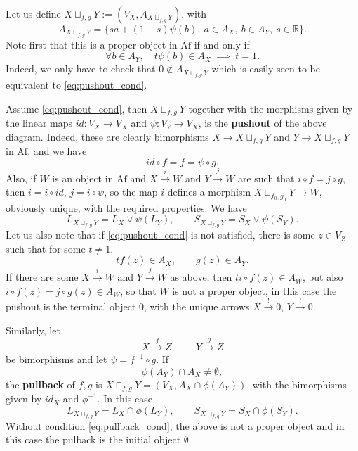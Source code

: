 \documentclass[12pt]{article}
\theoremstyle{definition}
\theoremstyle{remark}
\def \Af{\mathrm{Af}}
\begin{document}
Let us define  $X\sqcup_{f,g} Y:=(V_X,A_{X\sqcup_{f,g} Y})$, with 
\[
A_{X\sqcup_{f,g} Y}=\{sa+(1-s)\psi(b),\ a\in A_X,\ b\in A_Y,\ s\in \mathbb R\}.
\]
Note first that this is a proper object in $\Af$ if and only if 
\begin{equation}\label{eq:pushout_cond}
\forall b\in A_Y,\quad t\psi(b)\in A_X \ \implies \ t=1.
\end{equation}
Indeed, we only have to check that
$0\notin A_{X\sqcup_{f,g}Y}$ which is easily seen to be equivalent to
\eqref{eq:pushout_cond}. 

Assume \eqref{eq:pushout_cond}, then $X\sqcup_{f,g} Y$ together with the morphisms given by the linear maps
$id:V_X\to V_X$ and $\psi:V_Y\to V_X$,  is the \textbf{pushout} of the above diagram. Indeed, these are clearly bimorphisms $X\to X\sqcup_{f,g} Y$ and $Y\to X\sqcup_{f,g} Y$ in $\Af$, and we have 
\[
id\circ f=f=\psi\circ g.
\]
Also, if  $W$ is an object in $\Af$ and $X\xrightarrow{i} W$ and $Y\xrightarrow{j} W$ are such that $i\circ f=j\circ
g$, then $i=i\circ id$, $j=i\circ \psi$, so the map $i$ defines a morphism
$X\sqcup_{f_0,g_0} Y\to W$,
obviously unique, with the required properties. We have
\[
L_{X\sqcup_{f,g}Y}=L_X\vee \psi(L_Y),\qquad S_{X\sqcup_{f,g}Y}=S_X\vee
\psi(S_Y).
\]
Let us also note that if \eqref{eq:pushout_cond} is not satisfied,  there is some $z\in V_Z$ such
that for some $t\ne 1$,
\[
tf(z)\in A_X,\qquad g(z)\in A_Y.
\]
If there are some $X\xrightarrow{i} W$ and $Y\xrightarrow{j} W$ as above, then 
$ti\circ f(z)\in A_W$, but also $i\circ f(z)=j\circ g(z)\in A_W$, so that $W$ is not a
proper object, in this case the pushout is the terminal object $0$, with the unique arrows
$X\xrightarrow{!} 0$, $Y\xrightarrow{!} 0$.

Similarly, let 
\[
X\xrightarrow{f} Z,\qquad Y\xrightarrow{g} Z
\]
be  bimorphisms and let $\psi=f^{-1}\circ g$. If 
\begin{equation}\label{eq:pullback_cond}
\phi(A_Y)\cap A_X\ne \emptyset,
\end{equation}
 the \textbf{pullback} of $f, g$ is
$X\sqcap_{f,g}Y=(V_X, A_X\cap \phi(A_Y))$, 
with  the bimorphisms given by $id_X$ and $\phi^{-1}$. In this case
\[
L_{X\sqcap_{f,g}Y}=L_X\cap \phi(L_Y),\qquad S_{X\sqcap_{f,g}Y}=S_X\cap \phi(S_Y).
\]
Without  condition \eqref{eq:pullback_cond}, the above is not a proper object and in 
this case the pulback is the initial object $\emptyset$.
\end{document}
